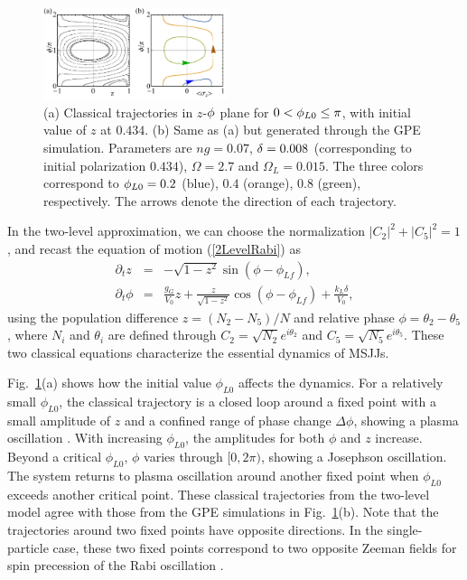 \documentclass[twocolumn,prl,floatfix,citeautoscript,nofootinbib,superscriptaddress]{revtex4}
\begin{document}
\begin{figure}[t]
\centering
\includegraphics[width=0.48\textwidth]{Fig4.pdf}
\caption{(a) Classical trajectories in $z$-$\protect\phi $ plane for $0<%
\protect\phi _{L0}\leq \protect\pi $, with initial value of $z$ at $0.434$.
(b) Same as (a) but generated through the GPE simulation. Parameters are $%
ng=0.07$, $\protect\delta =0.008$ (corresponding to initial polarization $%
0.434$), $\Omega =2.7$ and $\Omega _{L}=0.015$. The three colors correspond
to $\protect\phi _{L0}=0.2$ (blue), $0.4$ (orange), $0.8$ (green),
respectively. The arrows denote the direction of each trajectory.}
\label{fig4}
\end{figure}

In the two-level approximation, we can choose the normalization $\left\vert
C_{2}\right\vert ^{2}+\left\vert C_{5}\right\vert ^{2}=1$, and recast the
equation of motion (\ref{2LevelRabi}) as \cite{Supp}
\begin{eqnarray}
\partial _{t}z &=&-\sqrt{1-z^{2}}\sin \left( \phi -\phi _{Lf}\right) ,
\label{EOM1} \\
\partial _{t}\phi &=&\frac{g_{G}}{V_{0}}z+\frac{z}{\sqrt{1-z^{2}}}\cos
\left( \phi -\phi _{Lf}\right) +\frac{k_{L}\delta }{V_{0}},  \label{EOM2}
\end{eqnarray}%
using the population difference $z=(N_{2}-N_{5})/N$ and relative phase $\phi
=\theta _{2}-\theta _{5}$, where $N_{i}$ and $\theta _{i}$ are defined
through $C_{2}=\sqrt{N_{2}}e^{i\theta _{2}}$ and $C_{5}=\sqrt{N_{5}}%
e^{i\theta _{5}}$. These two classical equations characterize the essential
dynamics of MSJJs.

Fig.~\ref{fig4}(a) shows how the initial value $\phi _{L0}$ affects the
dynamics. For a relatively small $\phi _{L0}$, the classical trajectory is a
closed loop around a fixed point with a small amplitude of $z$ and a
confined range of phase change $\Delta \phi $, showing a plasma oscillation
\cite{Raghavan1999}. With increasing $\phi _{L0}$, the amplitudes for both $%
\phi $ and $z$ increase. Beyond a critical $\phi _{L0}$, $\phi $ varies
through $[0,2\pi )$, showing a Josephson oscillation. The system returns to
plasma oscillation around another fixed point when $\phi _{L0}$ exceeds
another critical point. These classical trajectories from the two-level
model agree with those from the GPE simulations in Fig.~\ref{fig4}(b). Note
that the trajectories around two fixed points have opposite directions. In
the single-particle case, these two fixed points correspond to two opposite
Zeeman fields for spin precession of the Rabi oscillation \cite{Supp}.
\end{document}
